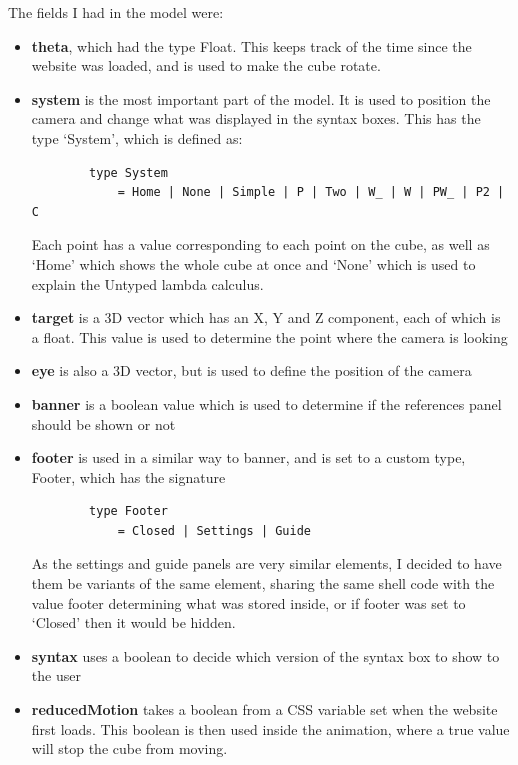 \documentclass{l4proj}
\begin{document}
The fields I had in the model were:
\begin{itemize}
    \item \textbf{theta}, which had the type Float.  This keeps track of the time since the website was loaded, and is used to make the cube rotate.

    \item \textbf{system} is the most important part of the model.  It is used to position the camera and change what was displayed in the syntax boxes.  This has the type `System', which is defined as: 

    \begin{lstlisting}
        type System
            = Home | None | Simple | P | Two | W_ | W | PW_ | P2 | C
    \end{lstlisting}
    Each point has a value corresponding to each point on the cube, as well as `Home' which shows the whole cube at once and `None' which is used to explain the Untyped lambda calculus.

    \item \textbf{target} is a 3D vector which has an X, Y and Z component, each of which is a float.  This value is used to determine the point where the camera is looking

    \item \textbf{eye} is also a 3D vector, but is used to define the position of the camera

    \item \textbf{banner} is a boolean value which is used to determine if the references panel should be shown or not

    \item \textbf{footer} is used in a similar way to banner, and is set to a custom type, Footer, which has the signature
    
    \begin{lstlisting}
        type Footer
            = Closed | Settings | Guide
    \end{lstlisting}

    As the settings and guide panels are very similar elements, I decided to have them be variants of the same element,  sharing the same shell code with the value footer determining what was stored inside, or if footer was set to `Closed' then it would be hidden.

    \item \textbf{syntax} uses a boolean to decide which version of the syntax box to show to the user

    \item \textbf{reducedMotion} takes a boolean from a CSS variable set when the website first loads.  This boolean is then used inside the animation, where a true value will stop the cube from moving.


\end{itemize}
\end{document}
